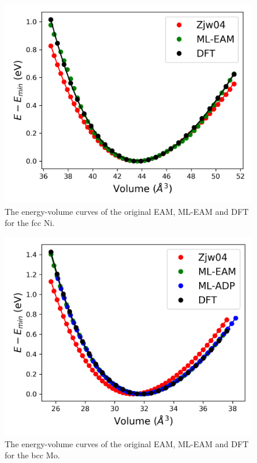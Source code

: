 \documentclass[prb,reprint]{revtex4-2}
\begin{document}
% 
%
\begin{figure}
\centering
\includegraphics[scale=0.65]{figures/Ni_all_eos.png}
\caption{\label{fig:Ni_eos} The energy-volume curves of the original EAM, 
ML-EAM and DFT for the fcc Ni.}
\end{figure}

% 
%
\begin{figure}
\centering
\includegraphics[scale=0.65]{figures/Mo_all_eos.png}
\caption{\label{fig:Mo_eos} The energy-volume curves of the original EAM, 
ML-EAM and DFT for the bcc Mo.}
\end{figure}
\end{document}
